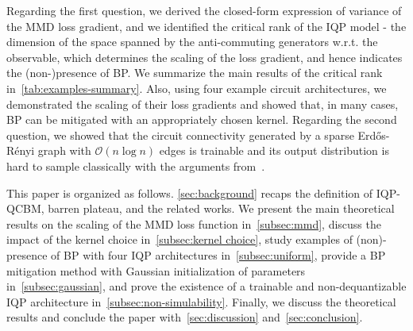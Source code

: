 \documentclass[10pt, twocolumn, a4paper]{article}
\theoremstyle{plain}
\theoremstyle{definition}
\theoremstyle{remark}
\begin{document}
Regarding the first question, we derived the closed-form expression of variance of the MMD loss gradient, and we identified the critical rank of the IQP model - the dimension of the space spanned by the anti-commuting generators w.r.t. the observable, which determines the scaling of the loss gradient, and hence indicates the (non-)presence of BP. We summarize the main results of the critical rank in~\cref{tab:examples-summary}. Also, using four example circuit architectures, we demonstrated the scaling of their loss gradients and showed that, in many cases, BP can be mitigated with an appropriately chosen kernel. Regarding the second question, we showed that the circuit connectivity generated by a sparse Erd\H os-R\'enyi graph with $\mathcal{O}(n\log n)$ edges is trainable and its output distribution is hard to sample classically with the arguments from~\cite{Bremner17}.

This paper is organized as follows. \cref{sec:background} recaps the definition of IQP-QCBM, barren plateau, and the related works. We present the main theoretical results on the scaling of the MMD loss function in~\cref{subsec:mmd}, discuss the impact of the kernel choice in~\cref{subsec:kernel choice}, study examples of (non)-presence of BP with four IQP architectures in~\cref{subsec:uniform}, provide a BP mitigation method with Gaussian initialization of parameters in~\cref{subsec:gaussian}, and prove the existence of a trainable and non-dequantizable IQP architecture in~\cref{subsec:non-simulability}. Finally, we discuss the theoretical results and conclude the paper with~\cref{sec:discussion} and~\cref{sec:conclusion}.
\end{document}

